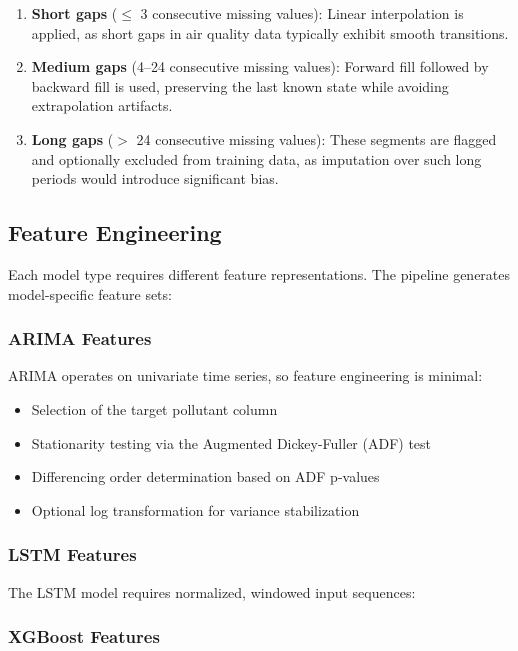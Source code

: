 \begin{enumerate}
    \item \textbf{Short gaps} ($\leq$ 3 consecutive missing values): Linear interpolation is applied, as short gaps in air quality data typically exhibit smooth transitions.
    
    \item \textbf{Medium gaps} (4--24 consecutive missing values): Forward fill followed by backward fill is used, preserving the last known state while avoiding extrapolation artifacts.
    
    \item \textbf{Long gaps} ($>$ 24 consecutive missing values): These segments are flagged and optionally excluded from training data, as imputation over such long periods would introduce significant bias.
\end{enumerate}


\subsection{Feature Engineering}

Each model type requires different feature representations. The pipeline generates model-specific feature sets:

\subsubsection{ARIMA Features}

ARIMA operates on univariate time series, so feature engineering is minimal:
\begin{itemize}
    \item Selection of the target pollutant column
    \item Stationarity testing via the Augmented Dickey-Fuller (ADF) test
    \item Differencing order determination based on ADF p-values
    \item Optional log transformation for variance stabilization
\end{itemize}

\subsubsection{LSTM Features}

The LSTM model requires normalized, windowed input sequences:


\subsubsection{XGBoost Features}

